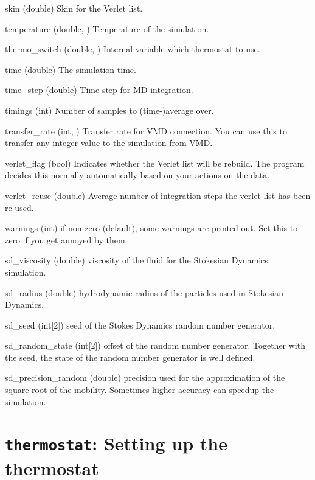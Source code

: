 \begin{globvar}
\item[skin] (double) Skin for the Verlet list.
\item [temperature] (double, \ro) Temperature of the
  simulation.
\item[thermo_switch] (double, \ro) Internal variable which thermostat
  to use. 
\item[time] (double) The simulation time.
\item[time_step] (double) Time step for MD integration.
\item[timings] (int) Number of samples to (time-)average over.
\item[transfer_rate] (int, \ro) Transfer rate for VMD connection. You
  can use this to transfer any integer value to the simulation from
  VMD.
\item[verlet_flag] (bool) Indicates whether the Verlet list will be
  rebuild. The program decides this normally automatically based on
  your actions on the data.
\item[verlet_reuse] (double) Average number of integration steps the
  verlet list has been re-used.
\item[warnings] (int) if non-zero (default), some warnings are printed
  out. Set this to zero if you get annoyed by them.
\item[sd_viscosity] (double) viscosity of the fluid for the Stokesian Dynamics
  simulation.
\item[sd_radius] (double) hydrodynamic radius of the particles used in
  Stokesian Dynamics.
\item[sd_seed] (int[2]) seed of the Stokes Dynamics random number generator.
\item[sd_random_state] (int[2]) offset of the random number
  generator. Together with the seed, the state of the random number generator
  is well defined.
\item[sd_precision_random] (double) precision used for the approximation of
  the square root of the mobility. Sometimes higher accuracy can speedup the
  simulation.
\end{globvar}

\section{\texttt{thermostat}: Setting up the thermostat}
\label{sec:thermostat}

\begin{pysyntax}
\end{pysyntax}

